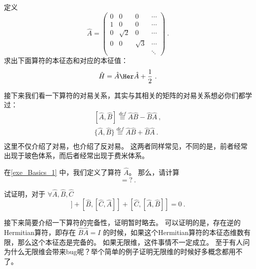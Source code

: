 \begin{exercise}{}\label{exe_Basics_1}
定义
\begin{equation}
\hat{A} = \left(
\begin{matrix}
0 & 0 & 0 & \cdots \\
1 & 0 & 0 & \cdots \\
0 & \sqrt{2} & 0 & \cdots\\
0 & 0 & \sqrt{3} & \cdots\\
  &  &  &  \ddots
\end{matrix}
\right)~.
\end{equation}
求出下面算符的本征态和对应的本征值：
\begin{equation}
\hat{H} = \hat{A}\Her\hat{A} + \frac{1}{2}~.
\end{equation}
\end{exercise}

接下来我们看一下算符的对易关系，其实与其相关的矩阵的对易关系想必你们都学过：
\begin{equation}
\begin{split}
[\hat{A},\hat{B}] \overset{def}{\equiv}\hat{A}\hat{B} - \hat{B}\hat{A}~,\\
\{\hat{A},\hat{B}\} \overset{def}{\equiv}\hat{A}\hat{B} + \hat{B}\hat{A}~.\\
\end{split}
\end{equation}
这里不仅介绍了对易，也介绍了反对易。 这两者同样常见，不同的是，前者经常出现于玻色体系，而后者经常出现于费米体系。

\begin{exercise}{}
在\autoref{exe_Basics_1} 中，我们定义了算符 $\hat{A}$。 那么，请计算
\begin{equation}
[\hat{A},\hat{A}\Her] = ?~.
\end{equation}
\end{exercise}

\begin{exercise}{}
试证明，对于 $\forall \hat{A}, \hat{B}, \hat{C}$
\begin{equation}
[\hat{A},[\hat{B},\hat{C}]] + [\hat{B},[\hat{C},\hat{A}]] + [\hat{C},[\hat{A},\hat{B}]] = 0~.
\end{equation}
\end{exercise}

接下来简要介绍一下算符的完备性，证明暂时略去。 可以证明的是，存在逆的Hermitian算符，即存在 $\hat{B}\hat{A} = I$ 的时候，如果这个Hermitian算符的本征态维数有限，那么这个本征态是完备的。 如果无限维，这件事情不一定成立。 至于有人问为什么无限维会带来bug呢？举个简单的例子证明无限维的时候好多概念都用不了。

